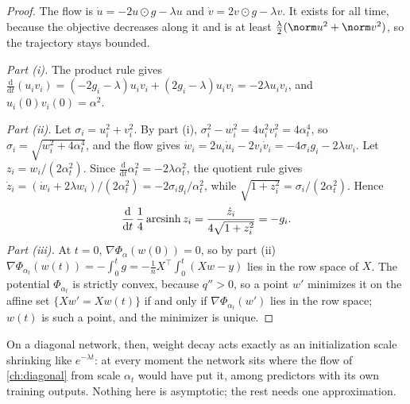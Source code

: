 \begin{refsection}

\begin{proof}
The flow is $\dot u=-2u\odot g-\lambda u$ and $\dot v=2v\odot g-\lambda v$. It exists for all time, because the objective decreases along it and is at least $\frac\lambda2(\norm u^2+\norm v^2)$, so the trajectory stays bounded.

\emph{Part (i).} The product rule gives $\frac{\mathrm d}{\mathrm dt}(u_iv_i)=(-2g_i-\lambda)u_iv_i+(2g_i-\lambda)u_iv_i=-2\lambda u_iv_i$, and $u_i(0)v_i(0)=\alpha^2$.

\emph{Part (ii).} Let $\sigma_i=u_i^2+v_i^2$. By part (i), $\sigma_i^2-w_i^2=4u_i^2v_i^2=4\alpha_t^4$, so $\sigma_i=\sqrt{w_i^2+4\alpha_t^4}$, and the flow gives $\dot w_i=2u_i\dot u_i-2v_i\dot v_i=-4\sigma_ig_i-2\lambda w_i$. Let $z_i=w_i/(2\alpha_t^2)$. Since $\frac{\mathrm d}{\mathrm dt}\alpha_t^2=-2\lambda\alpha_t^2$, the quotient rule gives $\dot z_i=(\dot w_i+2\lambda w_i)/(2\alpha_t^2)=-2\sigma_ig_i/\alpha_t^2$, while $\sqrt{1+z_i^2}=\sigma_i/(2\alpha_t^2)$. Hence
\[
  \frac{\mathrm d}{\mathrm dt}\,\frac14\operatorname{arcsinh} z_i=\frac{\dot z_i}{4\sqrt{1+z_i^2}}=-g_i .
\]
\emph{Part (iii).} At $t=0$, $\nabla\Phi_\alpha(w(0))=0$, so by part (ii) $\nabla\Phi_{\alpha_t}(w(t))=-\int_0^tg=-\frac1nX^\top\int_0^t(Xw-y)$ lies in the row space of $X$. The potential $\Phi_{\alpha_t}$ is strictly convex, because $q''>0$, so a point $w'$ minimizes it on the affine set $\{Xw'=Xw(t)\}$ if and only if $\nabla\Phi_{\alpha_t}(w')$ lies in the row space; $w(t)$ is such a point, and the minimizer is unique.
\end{proof}

On a diagonal network, then, weight decay acts exactly as an initialization scale shrinking like $e^{-\lambda t}$: at every moment the network sits where the flow of \cref{ch:diagonal} from scale $\alpha_t$ would have put it, among predictors with its own training outputs. Nothing here is asymptotic; the rest needs one approximation.


\end{refsection}
